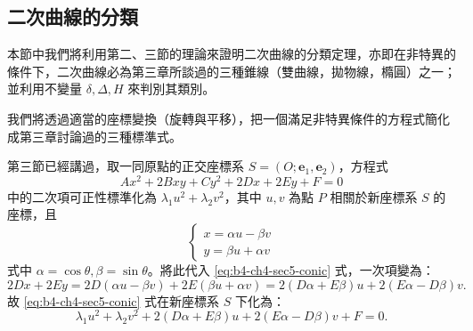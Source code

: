\subsection{二次曲線的分類}\label{sec:b4-4-5}

本節中我們將利用第二、三節的理論來證明二次曲線的分類定理，亦即在非特異的條件下，二次曲線必為第三章所談過的三種錐線（雙曲線，拋物線，橢圓）之一；並利用不變量 $\delta, \Delta, H$ 來判別其類別。

我們將透過適當的座標變換（旋轉與平移），把一個滿足非特異條件的方程式簡化成第三章討論過的三種標準式。

第三節已經講過，取一同原點的正交座標系 $S = (O; \mathbf{e}_1, \mathbf{e}_2)$，方程式
\begin{equation}
Ax^2 + 2Bxy + Cy^2 + 2Dx + 2Ey + F = 0
\label{eq:b4-ch4-sec5-conic}
\end{equation}
中的二次項可正性標準化為 $\lambda_1 u^2 + \lambda_2 v^2$，其中 $u, v$ 為點 $P$ 相關於新座標系 $S$ 的座標，且
\[
\begin{cases}
x = \alpha u - \beta v \\
y = \beta u + \alpha v
\end{cases}
\]
式中 $\alpha = \cos\theta, \beta = \sin\theta$。將此代入 \eqref{eq:b4-ch4-sec5-conic} 式，一次項變為：
\[
2Dx + 2Ey = 2D(\alpha u - \beta v) + 2E(\beta u + \alpha v) = 2(D\alpha + E\beta)u + 2(E\alpha - D\beta)v.
\]
故 \eqref{eq:b4-ch4-sec5-conic} 式在新座標系 $S$ 下化為：
\begin{equation}
\lambda_1 u^2 + \lambda_2 v^2 + 2(D\alpha + E\beta)u + 2(E\alpha - D\beta)v + F = 0.
\label{eq:b4-ch4-sec5-rotated}
\end{equation}

